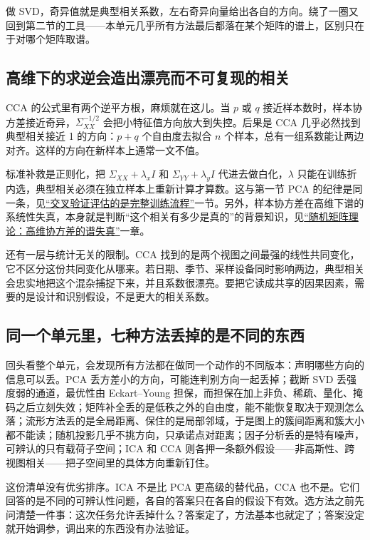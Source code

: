 做 SVD，奇异值就是典型相关系数，左右奇异向量给出各自的方向。绕了一圈又回到第二节的工具——本单元几乎所有方法最后都落在某个矩阵的谱上，区别只在于对哪个矩阵取谱。

\subsection{高维下的求逆会造出漂亮而不可复现的相关}

CCA 的公式里有两个逆平方根，麻烦就在这儿。当 \(p\) 或 \(q\) 接近样本数时，样本协方差接近奇异，\(\Sigma_{XX}^{-1/2}\) 会把小特征值方向放大到失控。后果是 CCA 几乎必然找到典型相关接近 1 的方向：\(p+q\) 个自由度去拟合 \(n\) 个样本，总有一组系数能让两边对齐。这样的方向在新样本上通常一文不值。

标准补救是正则化，把 \(\Sigma_{XX}+\lambda_x I\) 和 \(\Sigma_{YY}+\lambda_y I\) 代进去做白化，\(\lambda\) 只能在训练折内选，典型相关必须在独立样本上重新计算才算数。这与第一节 PCA 的纪律是同一条，见\hyperref[sec:11-Mathematical-Statistics/06-Resampling-and-Model-Selection/03]{``交叉验证评估的是完整训练流程''}一节。另外，样本协方差在高维下谱的系统性失真，本身就是判断``这个相关有多少是真的''的背景知识，见\hyperref[ch:094]{``随机矩阵理论：高维协方差的谱失真''}一章。

还有一层与统计无关的限制。CCA 找到的是两个视图之间最强的线性共同变化，它不区分这份共同变化从哪来。若日期、季节、采样设备同时影响两边，典型相关会忠实地把这个混杂捕捉下来，并且系数很漂亮。要把它读成共享的因果因素，需要的是设计和识别假设，不是更大的相关系数。

\subsection{同一个单元里，七种方法丢掉的是不同的东西}

回头看整个单元，会发现所有方法都在做同一个动作的不同版本：声明哪些方向的信息可以丢。PCA 丢方差小的方向，可能连判别方向一起丢掉；截断 SVD 丢强度弱的通道，最优性由 Eckart--Young 担保，而担保在加上非负、稀疏、量化、掩码之后立刻失效；矩阵补全丢的是低秩之外的自由度，能不能恢复取决于观测怎么落；流形方法丢的是全局距离、保住的是局部邻域，于是图上的簇间距离和簇大小都不能读；随机投影几乎不挑方向，只承诺点对距离；因子分析丢的是特有噪声，可辨认的只有载荷子空间；ICA 和 CCA 则各押一条额外假设——非高斯性、跨视图相关——把子空间里的具体方向重新钉住。

这份清单没有优劣排序。ICA 不是比 PCA 更高级的替代品，CCA 也不是。它们回答的是不同的可辨认性问题，各自的答案只在各自的假设下有效。选方法之前先问清楚一件事：这次任务允许丢掉什么？答案定了，方法基本也就定了；答案没定就开始调参，调出来的东西没有办法验证。
